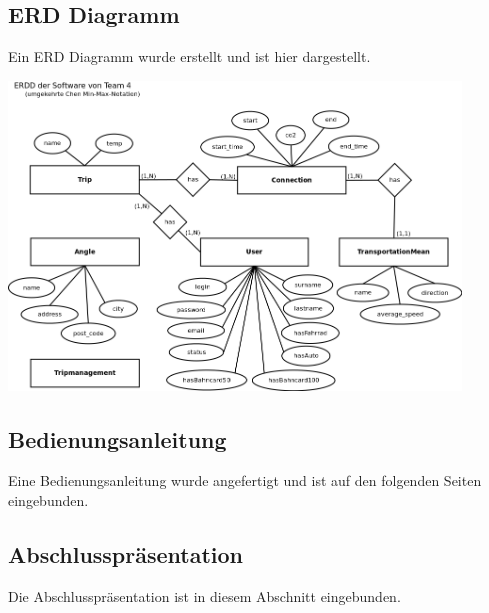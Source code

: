 \documentclass[12pt,a4paper]{article}
\begin{document}
\subsection{ERD Diagramm}

Ein ERD Diagramm wurde erstellt und ist hier dargestellt.

\begin{center}
\includegraphics[width=12cm]{11_erdd.png}
\end{center}

\newpage
\vspace*{40mm}
\subsection{Bedienungsanleitung}

Eine Bedienungsanleitung wurde angefertigt und ist auf den folgenden Seiten eingebunden.



\newpage
\vspace*{40mm}
\subsection{Abschlusspr\"asentation}

Die Abschlusspr\"asentation ist in diesem Abschnitt eingebunden.


\end{document}
